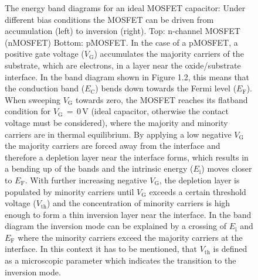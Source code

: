 \documentclass[main.tex]{subfiles}
\begin{document}
\begin{enumerate}
\begin{enumerate}
        \begin{figure}
        \centering{}
        \caption{The energy band diagrams for an ideal MOSFET capacitor: Under different bias conditions the MOSFET can be driven from accumulation (left) to inversion (right). Top: n-channel MOSFET (nMOSFET) Bottom: pMOSFET. In the case of a pMOSFET, a positive gate voltage (\( V_\mathrm {G} \)) accumulates the majority carriers of the substrate, which are electrons, in a layer near the oxide/substrate interface. In the band diagram shown in Figure 1.2, this means that the conduction band (\( E_\mathrm {C} \)) bends down towards the Fermi level (\( E_\mathrm {F} \)). When sweeping \( V_\mathrm {G} \) towards zero, the MOSFET reaches its flatband condition for \( V_\mathrm {G} \) \( = \) 0 V (ideal capacitor, otherwise the contact voltage must be considered), where the majority and minority carriers are in thermal equilibrium. By applying a low negative \( V_\mathrm {G} \) the majority carriers are forced away from the interface and therefore a depletion layer near the interface forms, which results in a bending up of the bands and the intrinsic energy (\( E_\mathrm {i} \)) moves closer to \( E_\mathrm {F} \). With further increasing negative \( V_\mathrm {G} \), the depletion layer is populated by minority carriers until \( V_\mathrm {G} \) exceeds a certain threshold voltage (\( V_{\mathrm {th}} \)) and the concentration of minority carriers is high enough to form a thin inversion layer near the interface. In the band diagram the inversion mode can be explained by a crossing of \( E_\mathrm {i} \) and \( E_\mathrm {F} \) where the minority carriers exceed the majority carriers at the interface. In this context it has to be mentioned, that \( V_{\mathrm {th}} \) is defined as a microscopic parameter which indicates the transition to the inversion mode.}
        \label{fig:16a_e}
        \end{figure}


\end{enumerate}
\end{enumerate}
\end{document}
